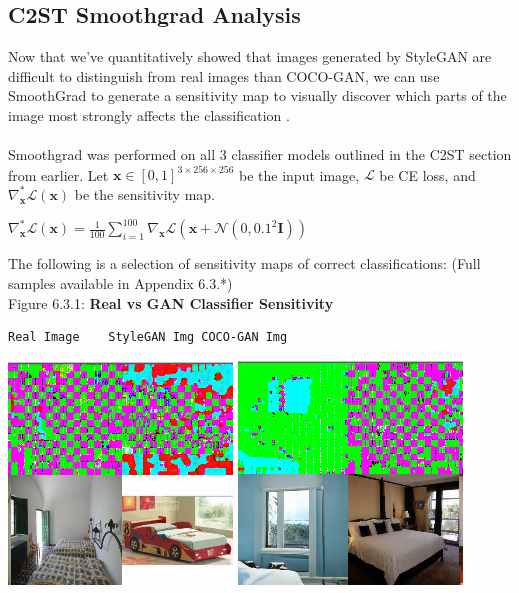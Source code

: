 \documentclass[10pt]{article}
\begin{document}
\begin{multicols*}{2}
        \subsection{C2ST Smoothgrad Analysis}
        Now that we've quantitatively showed that images generated by StyleGAN are difficult to distinguish from real images than COCO-GAN, we can use SmoothGrad to generate a sensitivity map to visually discover which parts of the image most strongly affects the classification \cite{smoothgrad}.
        \\\\
        Smoothgrad was performed on all 3 classifier models outlined in the C2ST section from earlier. 
        Let $\mathbf{x} \in [0, 1]^{3 \times 256 \times 256}$ be the input image, $\mathcal{L}$ be CE loss, and $\nabla_{\mathbf{x}}^{*} \mathcal{L} (\mathbf{x})$ be the sensitivity map.
        \begin{center}
            $\nabla_{\mathbf{x}}^{*} \mathcal{L} (\mathbf{x}) = \frac{1}{100} \sum_{i=1}^{100} \nabla_{\mathbf{x}} \mathcal{L} (\mathbf{x} + \mathcal{N}(0, 0.1^2\mathbf{I})) $
        \end{center}
        The following is a selection of sensitivity maps of correct classifications: (Full samples available in Appendix 6.3.*)\\ 
        Figure 6.3.1: \textbf{Real vs GAN Classifier Sensitivity}
        \begin{verbatim}Real Image    StyleGAN Img COCO-GAN Img\end{verbatim}
        \includegraphics[scale=0.3]{smoothgrad/combined/real.png}
        \includegraphics[scale=0.3]{smoothgrad/combined/stylegan.png}

\end{multicols*}
\end{document}
